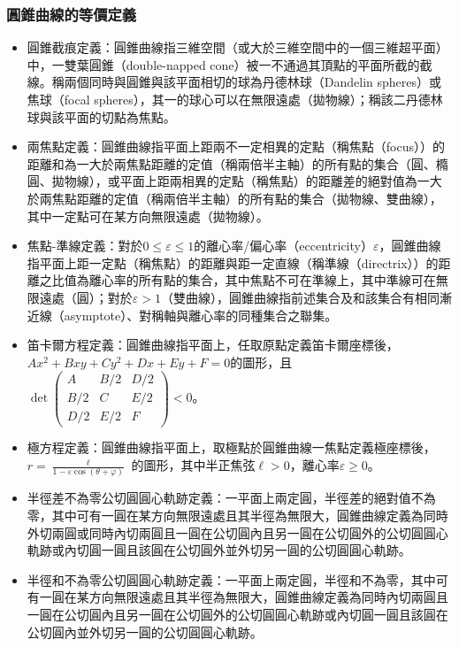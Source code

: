 \documentclass[a4paper,12pt]{report}
\begin{document}
\subsubsection{圓錐曲線的等價定義}
\begin{itemize}
\item 圓錐截痕定義：圓錐曲線指三維空間（或大於三維空間中的一個三維超平面）中，一雙葉圓錐（double-napped cone）被一不通過其頂點的平面所截的截線。稱兩個同時與圓錐與該平面相切的球為丹德林球（Dandelin spheres）或焦球（focal spheres），其一的球心可以在無限遠處（拋物線）；稱該二丹德林球與該平面的切點為焦點。
\item 兩焦點定義：圓錐曲線指平面上距兩不一定相異的定點（稱焦點（focus））的距離和為一大於兩焦點距離的定值（稱兩倍半主軸）的所有點的集合（圓、橢圓、拋物線），或平面上距兩相異的定點（稱焦點）的距離差的絕對值為一大於兩焦點距離的定值（稱兩倍半主軸）的所有點的集合（拋物線、雙曲線），其中一定點可在某方向無限遠處（拋物線）。
\item 焦點-準線定義：對於$0\leq\varepsilon\leq 1$的離心率/偏心率（eccentricity）$\varepsilon$，圓錐曲線指平面上距一定點（稱焦點）的距離與距一定直線（稱準線（directrix））的距離之比值為離心率的所有點的集合，其中焦點不可在準線上，其中準線可在無限遠處（圓）；對於$\varepsilon>1$（雙曲線），圓錐曲線指前述集合及和該集合有相同漸近線（asymptote）、對稱軸與離心率的同種集合之聯集。
\item 笛卡爾方程定義：圓錐曲線指平面上，任取原點定義笛卡爾座標後，$Ax^2+Bxy+Cy^2+Dx+Ey+F=0$的圖形，且$\det\begin{pmatrix} A & B/2 & D/2 \\ B/2 & C & E/2 \\ D/2 & E/2 & F \end{pmatrix}<0$。
    \item 極方程定義：圓錐曲線指平面上，取極點於圓錐曲線一焦點定義極座標後，$r=\frac{\ell}{1-\varepsilon\cos(\theta+\varphi)}$ 的圖形，其中半正焦弦$\ell>0$，離心率$\varepsilon\geq0$。
\item 半徑差不為零公切圓圓心軌跡定義：一平面上兩定圓，半徑差的絕對值不為零，其中可有一圓在某方向無限遠處且其半徑為無限大，圓錐曲線定義為同時外切兩圓或同時內切兩圓且一圓在公切圓內且另一圓在公切圓外的公切圓圓心軌跡或內切圓一圓且該圓在公切圓外並外切另一圓的公切圓圓心軌跡。
\item 半徑和不為零公切圓圓心軌跡定義：一平面上兩定圓，半徑和不為零，其中可有一圓在某方向無限遠處且其半徑為無限大，圓錐曲線定義為同時內切兩圓且一圓在公切圓內且另一圓在公切圓外的公切圓圓心軌跡或內切圓一圓且該圓在公切圓內並外切另一圓的公切圓圓心軌跡。
\end{itemize}
\end{document}
